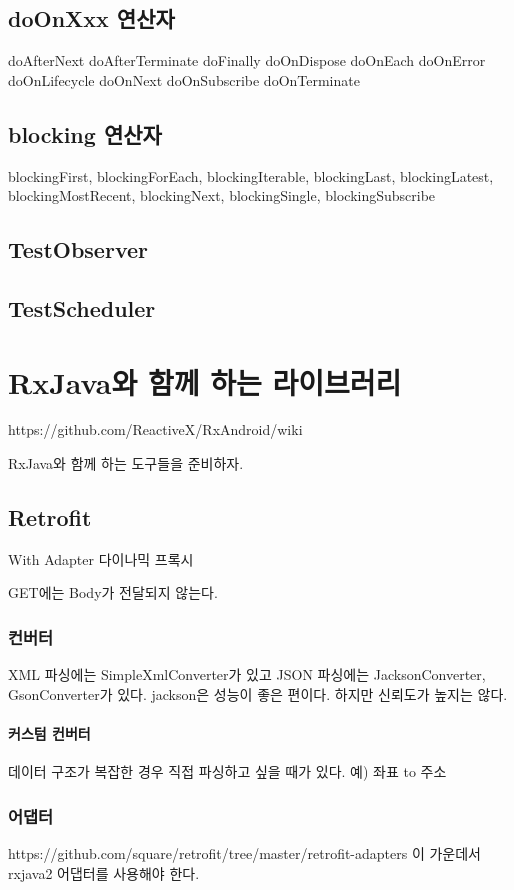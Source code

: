 \documentclass{book}
\begin{document}
{\section{doOnXxx 연산자}
doAfterNext
doAfterTerminate
doFinally
doOnDispose
doOnEach
doOnError
doOnLifecycle
doOnNext
doOnSubscribe
doOnTerminate

\section{blocking 연산자}
blockingFirst,
blockingForEach,
blockingIterable,
blockingLast,
blockingLatest,
blockingMostRecent,
blockingNext,
blockingSingle,
blockingSubscribe

\section{TestObserver}

\section{TestScheduler}

\chapter{RxJava와 함께 하는 라이브러리}
https://github.com/ReactiveX/RxAndroid/wiki

RxJava와 함께 하는 도구들을 준비하자. 


\section{Retrofit}
With Adapter
다이나믹 프록시

GET에는 Body가 전달되지 않는다. 

\subsection{컨버터}
XML 파싱에는 SimpleXmlConverter가 있고 JSON 파싱에는 JacksonConverter, GsonConverter가 있다.
jackson은 성능이 좋은 편이다. 하지만 신뢰도가 높지는 않다.

\subsubsection{커스텀 컨버터}
데이터 구조가 복잡한 경우 직접 파싱하고 싶을 때가 있다. 
예) 좌표 to 주소

\subsection{어댑터}
https://github.com/square/retrofit/tree/master/retrofit-adapters
이 가운데서 rxjava2 어댑터를 사용해야 한다.

}
\end{document}
